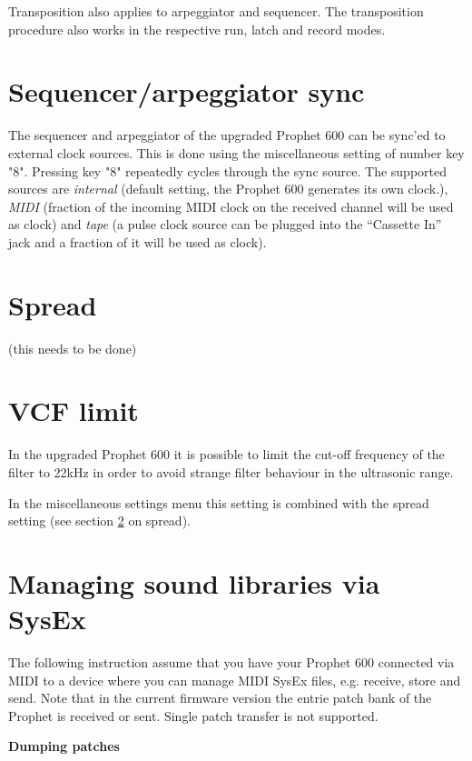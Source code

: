 \documentclass[draft,landscape, 11pt, oneside]{report}
\newenvironment{flowtext}{\addmargin[0cm]{7cm}}{\endaddmargin} %
\begin{document}
\begin{flowtext}
Transposition also applies to arpeggiator and sequencer. The transposition procedure also works in the respective run, latch and record modes.

\section{Sequencer/arpeggiator sync}\label{sync}

The sequencer and arpeggiator of the upgraded Prophet 600 can be sync'ed to external clock sources. This is done using the miscellaneous setting of number key "8". Pressing key "8" repeatedly cycles through the sync source. The supported sources are \textit{internal} (default setting, the Prophet 600 generates its own clock.), \textit{MIDI} (fraction of the incoming MIDI clock on the received channel will be used as clock) and \textit{tape} (a pulse clock source can be plugged into the “Cassette In” jack and a fraction of it will be used as clock).

\section{Spread}\label{spreadsett}

(this needs to be done)

\section{VCF limit}\label{limitsett}

In the upgraded Prophet 600 it is possible to limit the cut-off frequency of the filter to 22kHz in order to avoid strange filter behaviour in the ultrasonic range.

In the miscellaneous settings menu this setting is combined with the spread setting (see section \ref{spreadsett} on spread).  

\section{Managing sound libraries via SysEx}\label{mididump}

The following instruction assume that you have your Prophet 600 connected via MIDI to a device where you can manage MIDI SysEx files, e.g. receive, store and send. Note that in the current firmware version the entrie patch bank of the Prophet is received or sent. Single patch transfer is not supported. 

\textbf{Dumping patches} 


\end{flowtext}
\end{document}
